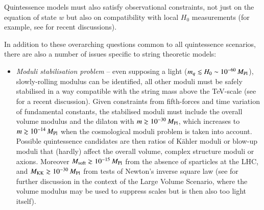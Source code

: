 Quintessence models must also satisfy observational constraints, not just on the equation of state $w$ but also on compatibility with local $H_0$ measurements (for example, see
\cite{Colgain:2019joh, Banerjee:2020xcn, Lee:2022cyh, Heisenberg:2022lob, Heisenberg:2022gqk,Colgain:2022rxy} for recent discussions).

In addition to these overarching questions common to all quintessence scenarios, there are also a number of issues specific to string theoretic models:
\begin{itemize}
\item \emph{Moduli stabilisation problem} -- even supposing a light ($m_q \lesssim H_0 \sim 10^{-60}\,M_{\rm Pl}$), slowly-rolling modulus can be identified, all other moduli must be safely stabilised in a way compatible with the string mass above the TeV-scale (see \cite{Hebecker:2019csg} for a recent discussion). Given constraints from fifth-forces and time variation of fundamental constants, the stabilised moduli must include the overall volume modulus and the dilaton with $m \gtrsim 10^{-30}\,M_{\rm Pl}$, which increases to $m \gtrsim 10^{-14}\,M_{\rm Pl}$ when the cosmological moduli problem is taken into account. Possible quintessence candidates are then ratios of K\"ahler moduli or blow-up moduli that (hardly) affect the overall volume, complex structure moduli or axions. Moreover $M_{\rm soft} \gtrsim 10^{-15}\,M_{\rm Pl}$ from the absence of sparticles at the LHC, and $M_{\rm KK} \gtrsim 10^{-30}\,M_{\rm Pl}$ from tests of Newton's inverse square law (see \cite{Hebecker:2019csg} for further discussion in the context of the Large Volume Scenario, where the volume modulus may be used to suppress scales but is then also too light itself).


\end{itemize}
